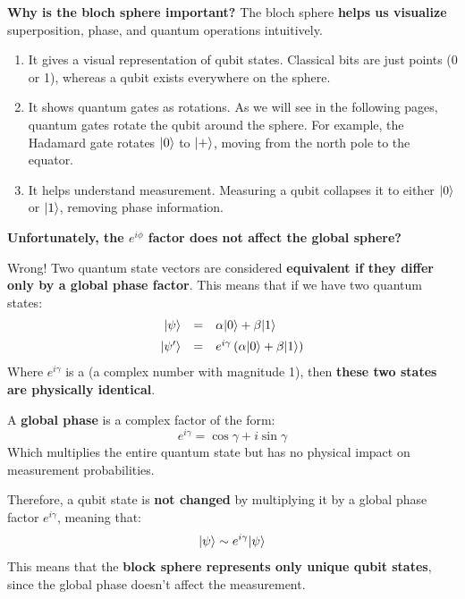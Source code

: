 \highspace
\textcolor{Green3}{ \textbf{Why is the bloch sphere important?}}
The bloch sphere \textbf{helps us visualize} superposition, phase, and quantum operations intuitively.
\begin{enumerate}
    \item It gives a visual representation of qubit states. Classical bits are just points (0 or 1), whereas a qubit exists everywhere on the sphere.
    
    \item It shows quantum gates as rotations. As we will see in the following pages, quantum gates rotate the qubit around the sphere. For example, the Hadamard gate rotates $| 0 \rangle$ to $| + \rangle$, moving from the north pole to the equator.

    \item It helps understand measurement. Measuring a qubit collapses it to either $| 0 \rangle$ or $| 1 \rangle$, removing phase information.
\end{enumerate}

\highspace
\begin{flushleft}
    \textcolor{Green3}{ \textbf{Unfortunately, the $e^{i\phi}$ factor does not affect the global sphere?}}
\end{flushleft}
Wrong! Two quantum state vectors are considered \textbf{equivalent if they differ only by a global phase factor}. This means that if we have two quantum states:  
\begin{equation*}
    \begin{array}{rcl}
        | \psi \rangle  &=& \alpha| 0 \rangle + \beta| 1 \rangle \\[.5em]
        | \psi' \rangle &=& e^{i\gamma}\left(\alpha| 0 \rangle + \beta| 1 \rangle\right)
    \end{array}
\end{equation*}
Where $e^{i\gamma}$ is a  (a complex number with magnitude 1), then \textbf{these two states are physically identical}.

\highspace
A \textbf{global phase} is a complex factor of the form:
\begin{equation*}
    e^{i\gamma} = \cos\gamma + i\sin\gamma
\end{equation*}
Which multiplies the entire quantum state but has no physical impact on measurement probabilities.

\highspace
Therefore, a qubit state is \textbf{not changed} by multiplying it by a global phase factor $e^{i\gamma}$, meaning that:
\begin{equation*}
    | \psi \rangle \sim e^{i \gamma} | \psi \rangle
\end{equation*}
This means that the \textbf{block sphere represents only unique qubit states}, since the global phase doesn't affect the measurement.

